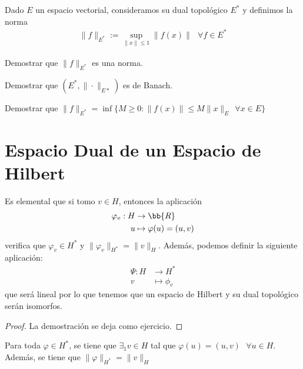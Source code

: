 \begin{definicion}
    Dado $E$ un espacio vectorial, consideramos su dual topológico $E^*$ y definimos la norma
    \begin{gather*}
        \|f\|_{E^*} := \sup_{\|x\|\leq 1} \|f(x)\| \ \ \ \forall f \in E^*
    \end{gather*}
\end{definicion}

\begin{ejercicio} %
    Demostrar que $\|f\|_{E^*}$ es una norma.\\

    
\end{ejercicio}

\begin{ejercicio}
    Demostrar que $(E^*, \|\cdot\|_{E*})$ es de Banach.
\end{ejercicio}

\begin{ejercicio}
    Demostrar que $\|f\|_{E^*} = \inf\{M\geq 0 : \|f(x)\| \leq M\|x\|_E\ \ \forall x \in E\}$
\end{ejercicio}

\section{Espacio Dual de un Espacio de Hilbert}

\begin{observacion}
    Es elemental que si tomo $v\in H$, entonces la aplicación
    \begin{align*}
        \varphi_v : H &\to \bb{R}\\
        u &\mapsto \varphi(u) = (u,v)
    \end{align*}
    verifica que $\varphi_v\in H^*$ y $\|\varphi_v\|_{H^*} = \|v\|_H$. Además, podemos definir la siguiente aplicación:
    \begin{align*}
        \Psi: H &\to H^*\\
        v &\mapsto \phi_v
    \end{align*}
    que será lineal por lo que tenemos que un espacio de Hilbert y su dual topológico serán isomorfos.

    \begin{proof}
        La demostración se deja como ejercicio.
    \end{proof}
\end{observacion}

\begin{teo}
    Para toda $\varphi\in H^*$, se tiene que $\exists_1 v\in H$ tal que $\varphi(u)=(u,v)\ \ \ \forall u\in H$. Además, se tiene que $\|\varphi\|_{H^*} = \|v\|_H$
\end{teo}

